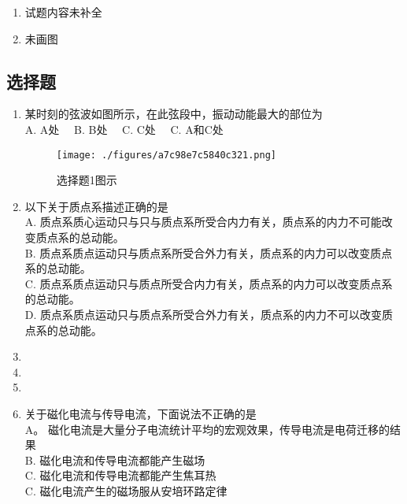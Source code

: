 
\begin{issues}
\issueTODO
\begin{enumerate}
\item 试题内容未补全
\item 未画图
\end{enumerate}

\end{issues}


\subsection{选择题}

\begin{enumerate}

\item 某时刻的弦波如图所示，在此弦段中，振动动能最大的部位为\\

A. A处$\quad$
B. B处$\quad$
C. C处$\quad$
C. A和C处$\quad$
\begin{figure}[ht]
\centering
\texttt{[image: ./figures/a7c98e7c5840c321.png]}
\caption{选择题1图示} \label{fig_CAS18_1}
\end{figure}
\item 以下关于质点系描述正确的是\\

A. 质点系质心运动只与只与质点系所受合内力有关，质点系的内力不可能改变质点系的总动能。\\
B. 质点系质点运动只与质点系所受合外力有关，质点系的内力可以改变质点系的总动能。\\
C. 质点系质点运动只与质点所受合内力有关，质点系的内力可以改变质点系的总动能。\\
D. 质点系质点运动只与质点系所受合外力有关，质点系的内力不可以改变质点系的总动能。\\

\item 

\item 

\item 

\item 关于磁化电流与传导电流，下面说法不正确的是\\

A。 磁化电流是大量分子电流统计平均的宏观效果，传导电流是电荷迁移的结果\\
B. 磁化电流和传导电流都能产生磁场\\
C. 磁化电流和传导电流都能产生焦耳热\\
C. 磁化电流产生的磁场服从安培环路定律\\


\end{enumerate}
